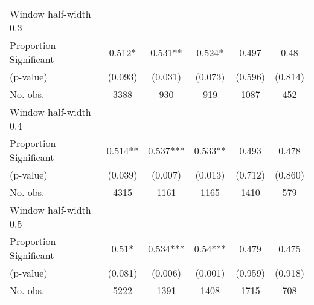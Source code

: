 \begin{tabular}{l*{5}{c}}
\hline
Window half-width 0.3\\

Proportion Significant& 0.512* &  0.531** &  0.524* &  0.497 &  0.48\\

(p-value) & (0.093) &  (0.031) &  (0.073) &  (0.596) &  (0.814)\\

No. obs.& 3388 &  930 &  919 &  1087 &  452\\

\hline
Window half-width 0.4\\

Proportion Significant& 0.514** &  0.537*** &  0.533** &  0.493 &  0.478\\

(p-value) & (0.039) &  (0.007) &  (0.013) &  (0.712) &  (0.860)\\

No. obs.& 4315 &  1161 &  1165 &  1410 &  579\\

\hline
Window half-width 0.5\\

Proportion Significant& 0.51* &  0.534*** &  0.54*** &  0.479 &  0.475\\

(p-value) & (0.081) &  (0.006) &  (0.001) &  (0.959) &  (0.918)\\

No. obs.& 5222 &  1391 &  1408 &  1715 &  708\\

\hline\hline
\end{tabular}

